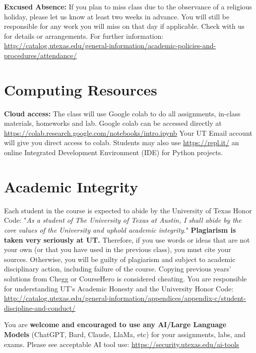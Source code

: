 \documentclass[11pt,fourier]{article}
\begin{document}
\textbf{Excused Absence:} If you plan to miss class due to the observance of a religious holiday, please let us know at least two weeks in advance. You will still be responsible for any work you will miss on that day if applicable. Check with us for details or arrangements. For further information: \href{http://catalog.utexas.edu/general-information/academic-policies-and-procedures/attendance/}{http://catalog.utexas.edu/general-information/academic-policies-and-procedures/attendance/}

\section*{Computing Resources}
\textbf{Cloud access:} The class will use Google colab to do all assignments, in-class materials, homeworks and lab. Google colab can be accessed directly at \href{https://colab.research.google.com/notebooks/intro.ipynb}{https://colab.research.google.com/notebooks/intro.ipynb} Your UT Email account will give you direct access to colab. Students may also use \href{https://repl.it/}{https://repl.it/} an online Integrated Development Environment (IDE) for Python projects.

\section*{Academic Integrity}
Each student in the course is expected to abide by the University of Texas Honor Code: "\textit{As a student of The University of Texas at Austin, I shall abide by the core values of the University and uphold academic integrity.}" \textbf{Plagiarism is taken very seriously at UT.} Therefore, if you use words or ideas that are not your own (or that you have used in the previous class), you must cite your sources. Otherwise, you will be guilty of plagiarism and subject to academic disciplinary action, including failure of the course. Copying previous years' solutions from Chegg or CourseHero is considered cheating. You are responsible for understanding UT's Academic Honesty and the University Honor Code: \href{http://catalog.utexas.edu/general-information/appendices/appendix-c/student-discipline-and-conduct/}{http://catalog.utexas.edu/general-information/appendices/appendix-c/student-discipline-and-conduct/}

You are \textbf{welcome and encouraged to use any AI/Large Language Models} (ChatGPT, Bard, Claude, LlaMa, etc) for your assignments, labs, and exams. Please see acceptable AI tool use: 
\href{https://security.utexas.edu/ai-tools}{https://security.utexas.edu/ai-tools}
\end{document}
